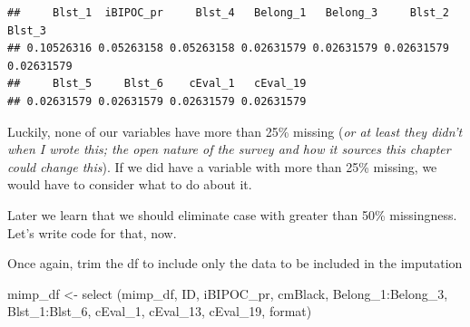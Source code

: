 \documentclass[
  english,
]{book}
\newenvironment{Shaded}{\begin{snugshade}}{\end{snugshade}}
\newcommand{\AttributeTok}[1]{\textcolor[rgb]{0.77,0.63,0.00}{#1}}
\newcommand{\CommentTok}[1]{\textcolor[rgb]{0.56,0.35,0.01}{\textit{#1}}}
\newcommand{\DecValTok}[1]{\textcolor[rgb]{0.00,0.00,0.81}{#1}}
\newcommand{\FunctionTok}[1]{\textcolor[rgb]{0.00,0.00,0.00}{#1}}
\newcommand{\NormalTok}[1]{#1}
\newcommand{\OtherTok}[1]{\textcolor[rgb]{0.56,0.35,0.01}{#1}}
\newcommand{\SpecialCharTok}[1]{\textcolor[rgb]{0.00,0.00,0.00}{#1}}
\begin{document}
\begin{verbatim}
##     Blst_1  iBIPOC_pr     Blst_4   Belong_1   Belong_3     Blst_2     Blst_3 
## 0.10526316 0.05263158 0.05263158 0.02631579 0.02631579 0.02631579 0.02631579 
##     Blst_5     Blst_6    cEval_1   cEval_19 
## 0.02631579 0.02631579 0.02631579 0.02631579
\end{verbatim}

Luckily, none of our variables have more than 25\% missing (\emph{or at least they didn't when I wrote this; the open nature of the survey and how it sources this chapter could change this}). If we did have a variable with more than 25\% missing, we would have to consider what to do about it.

Later we learn that we should eliminate case with greater than 50\% missingness. Let's write code for that, now.

\begin{Shaded}
\end{Shaded}

Once again, trim the df to include only the data to be included in the imputation

\begin{Shaded}
\begin{Highlighting}[]
\NormalTok{mimp\_df }\OtherTok{\textless{}{-}}  \FunctionTok{select}\NormalTok{ (mimp\_df, ID, iBIPOC\_pr, cmBlack, Belong\_1}\SpecialCharTok{:}\NormalTok{Belong\_3, Blst\_1}\SpecialCharTok{:}\NormalTok{Blst\_6, cEval\_1, cEval\_13, cEval\_19, format)}
\end{Highlighting}
\end{Shaded}
\end{document}
